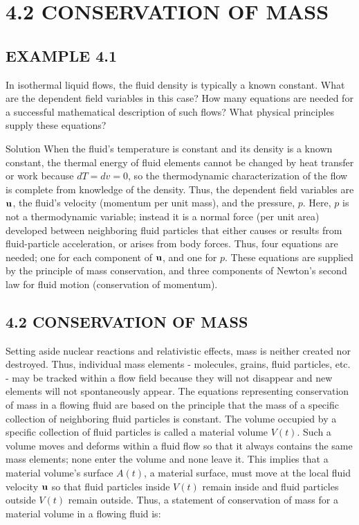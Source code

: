 \documentclass{article}
\begin{document}
\section{4.2 CONSERVATION OF MASS}

\subsection*{EXAMPLE 4.1}

In isothermal liquid flows, the fluid density is typically a known constant. What are the dependent field variables in this case? How many equations are needed for a successful mathematical description of such flows? What physical principles supply these equations?

Solution
When the fluid's temperature is constant and its density is a known constant, the thermal energy of fluid elements cannot be changed by heat transfer or work because $dT=dv=0$, so the thermodynamic characterization of the flow is complete from knowledge of the density. Thus, the dependent field variables are ${\bf u}$, the fluid's velocity (momentum per unit mass), and the pressure, $p$. Here, $p$ is not a thermodynamic variable; instead it is a normal force (per unit area) developed between neighboring fluid particles that either causes or results from fluid-particle acceleration, or arises from body forces. Thus, four equations are needed; one for each component of ${\bf u}$, and one for $p$. These equations are supplied by the principle of mass conservation, and three components of Newton's second law for fluid motion (conservation of momentum).

\subsection*{4.2 CONSERVATION OF MASS}

Setting aside nuclear reactions and relativistic effects, mass is neither created nor destroyed. Thus, individual mass elements - molecules, grains, fluid particles, etc. - may be tracked within a flow field because they will not disappear and new elements will not spontaneously appear. The equations representing conservation of mass in a flowing fluid are based on the principle that the mass of a specific collection of neighboring fluid particles is constant. The volume occupied by a specific collection of fluid particles is called a material volume $V(t)$. Such a volume moves and deforms within a fluid flow so that it always contains the same mass elements; none enter the volume and none leave it. This implies that a material volume's surface $A(t)$, a material surface, must move at the local fluid velocity ${\bf u}$ so that fluid particles inside $V(t)$ remain inside and fluid particles outside $V(t)$ remain outside. Thus, a statement of conservation of mass for a material volume in a flowing fluid is:
\end{document}
